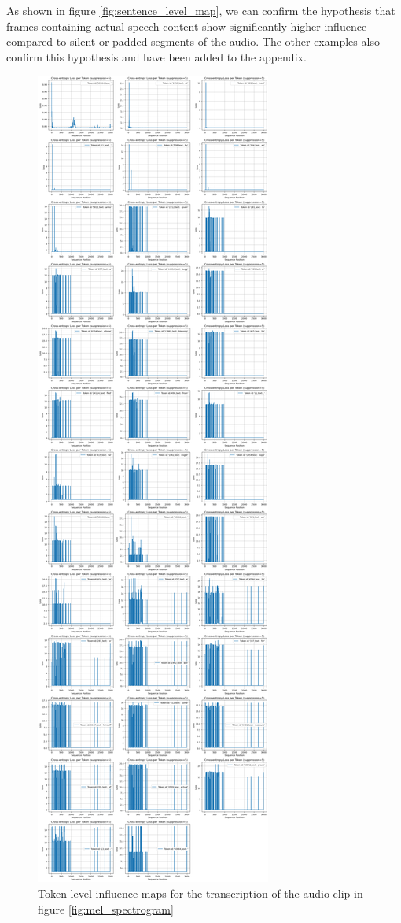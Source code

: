 \documentclass[../report.tex]{subfiles}
\begin{document}
    As shown in figure \ref{fig:sentence_level_map}, we can confirm the hypothesis that frames containing actual speech content show significantly higher influence compared to silent or padded segments of the audio. The other examples also confirm this hypothesis and have been added to the appendix.

    \begin{figure}[p]
        \centering
        \includegraphics[width=\textwidth,height=0.9\textheight,keepaspectratio]{figures/per_token_5_5.png}
        \caption{Token-level influence maps for the transcription of the audio clip in figure \ref{fig:mel_spectrogram}}
        \label{fig:token_level_map}
    \end{figure}
\end{document}
